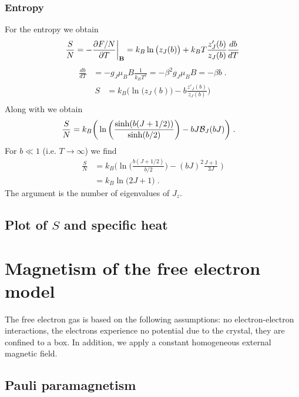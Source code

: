 %
\subsubsection{Entropy}
%
For the entropy we obtain
\begin{align*}
\frac{S}{N} &=-\frac{\partial F/N}{\partial T}\bigg|_{\mathbf B} = k_{B} \ln\big(z_{J}(b)\big)
+k_{B}T \frac{z'_{J}(b)}{z_{J}(b)} \frac{d b}{dT}\\
\end{align*}
%
%
\begin{align*}
 \frac{d b}{dT} &=  -g_{J}\mu_{B} B \frac{1}{k_{B}T^{2}}
 = -\beta^{2} g_{J}\mu_{B} B = - \beta b\;.
\end{align*}
%
\begin{align*}
S &= k_{B} \bigg(\ln\big(z_{J}(b)\big)
-b\frac{z'_{J}(b)}{z_{J}(b)} \bigg)\\
\end{align*}
Along with  we obtain
\begin{align*}
\frac{S}{N} &= k_{B} \bigg(\ln\bigg(
\frac{\sinh(b (J+1/2))}{\sinh(b/2)}
\bigg)
-b J{\cal B}_{J}(b J) \bigg)\;.
\end{align*}
For  $b \ll 1$ (i.e. $T\to \infty$) we find 
%
\begin{align*}
\frac{S}{N} &=  k_{B} \bigg(\ln\bigg(
\frac{b(J+1/2)}{b/2}
\bigg)
-(b J)^{2} \frac{J+1}{3J}\; \bigg)\\
&=k_{B} \ln\big(2J+1\big)\;.
\end{align*}
%
The argument is the number of eigenvalues of $J_{z}$.
\subsection{Plot of $S$ and specific heat}
%
\section{Magnetism of the free electron model}
The free electron gas is based on the following assumptions: no electron-electron interactions, 
the electrons experience no potential due to the crystal, they  are confined to a box. In addition,
we apply a constant homogeneous external magnetic field. 


\subsection{Pauli paramagnetism}

